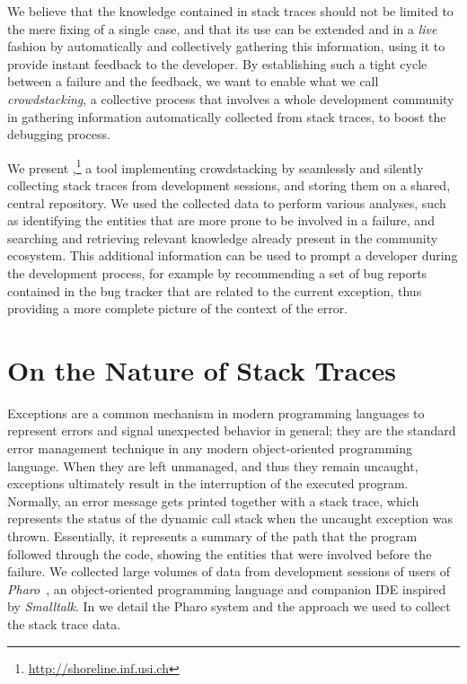 We believe that the knowledge contained in stack traces should not be limited to the mere fixing of a single case, and that its use can be extended and in a \emph{live} fashion by automatically and collectively gathering this information, using it to provide instant feedback to the developer.
By establishing such a tight cycle between a failure and the feedback, we want to enable what we call \emph{crowdstacking}, a collective process that involves a whole development community in gathering information automatically collected from stack traces, to boost the debugging process.

We present \shr,\footnote{\url{http://shoreline.inf.usi.ch}} a tool implementing crowdstacking by seamlessly and silently collecting stack traces from development sessions, and storing them on a shared, central repository.
We used the collected data to perform various analyses, such as identifying the entities that are more prone to be involved in a failure, and searching and retrieving relevant knowledge already present in the community ecosystem.
This additional information can be used to prompt a developer during the development process, for example by recommending  a set of bug reports contained in the bug tracker that are related to the current exception, thus providing a more complete picture of the context of the error.



\section{On the Nature of Stack Traces} \label{sec:stacktraces-nature}

Exceptions are a common mechanism in modern programming languages to represent errors and signal unexpected behavior in general; they are the standard error management technique in any modern object-oriented programming language.
When they are left unmanaged, and thus they remain uncaught, exceptions ultimately result in the interruption of the executed program.
Normally, an error message gets printed together with a stack trace, which represents the status of the dynamic call stack when the uncaught exception was thrown.
Essentially, it represents a summary of the path that the program followed through the code, showing the entities that were involved before the failure.
We collected large volumes of data from development sessions of users of \textit{Pharo}~\cite{black2009}, an object-oriented programming language  and companion IDE inspired by \textit{Smalltalk}.
In  we detail the Pharo system and the approach we used to collect the stack trace data.


